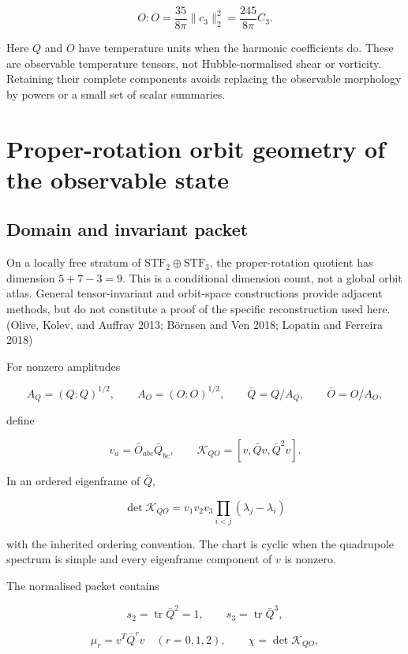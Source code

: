 \documentclass[
  11pt,
  a4paper]{article}
\begin{document}
\[
\boxed{O:O=\frac{35}{8\pi}\|c_3\|_2^2
=\frac{245}{8\pi}C_3}.
\]

Here \(Q\) and \(O\) have temperature units when the harmonic coefficients do. These are observable temperature tensors, not Hubble-normalised shear or vorticity. Retaining their complete components avoids replacing the observable morphology by powers or a small set of scalar summaries.

\hypertarget{proper-rotation-orbit-geometry-of-the-observable-state}{%
\section{Proper-rotation orbit geometry of the observable state}\label{proper-rotation-orbit-geometry-of-the-observable-state}}

\hypertarget{domain-and-invariant-packet}{%
\subsection{Domain and invariant packet}\label{domain-and-invariant-packet}}

On a locally free stratum of \(\mathrm{STF}_2\oplus\mathrm{STF}_3\), the proper-rotation quotient has dimension \(5+7-3=9\). This is a conditional dimension count, not a global orbit atlas. General tensor-invariant and orbit-space constructions provide adjacent methods, but do not constitute a proof of the specific reconstruction used here. (Olive, Kolev, and Auffray 2013; Börnsen and Ven 2018; Lopatin and Ferreira 2018)

For nonzero amplitudes

\[
A_Q=(Q:Q)^{1/2},\qquad A_O=(O:O)^{1/2},
\qquad \bar Q=Q/A_Q,\qquad \bar O=O/A_O,
\]

define

\[
v_a=\bar O_{abc}\bar Q_{bc},
\qquad \mathscr K_{QO}=[v,\bar Qv,\bar Q^2v].
\]

In an ordered eigenframe of \(\bar Q\),

\[
\det\mathscr K_{QO}
=v_1v_2v_3\prod_{i<j}(\lambda_j-\lambda_i)
\]

with the inherited ordering convention. The chart is cyclic when the quadrupole spectrum is simple and every eigenframe component of \(v\) is nonzero.

The normalised packet contains

\[
s_2=\operatorname{tr}\bar Q^2=1,
\qquad s_3=\operatorname{tr}\bar Q^3,
\]

\[
\mu_r=v^T\bar Q^rv\quad(r=0,1,2),
\qquad \chi=\det\mathscr K_{QO},
\]
\end{document}
